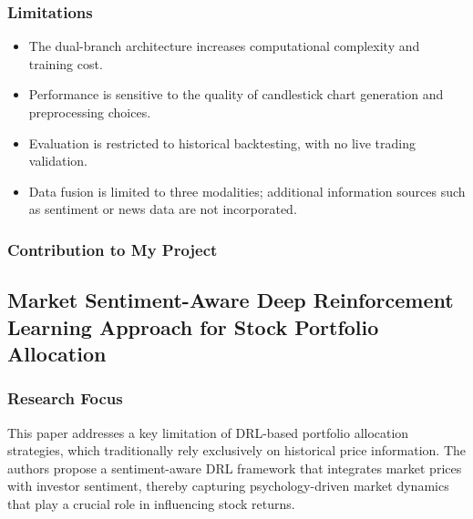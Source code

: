 \documentclass[12pt,a4paper]{report}
\begin{document}
\subsubsection{Limitations}
\begin{itemize}
    \item The dual-branch architecture increases computational complexity and training cost.  
    \item Performance is sensitive to the quality of candlestick chart generation and preprocessing choices.  
    \item Evaluation is restricted to historical backtesting, with no live trading validation.  
    \item Data fusion is limited to three modalities; additional information sources such as sentiment or news data are not incorporated.  
\end{itemize}

\subsubsection{Contribution to My Project}



\subsection{Market Sentiment-Aware Deep Reinforcement Learning Approach for Stock Portfolio Allocation \cite{koratamaddi2021sentiment}}

\subsubsection{Research Focus}
This paper addresses a key limitation of DRL-based portfolio allocation strategies, which traditionally rely exclusively on historical price information. The authors propose a sentiment-aware DRL framework that integrates market prices with investor sentiment, thereby capturing psychology-driven market dynamics that play a crucial role in influencing stock returns.
\end{document}
